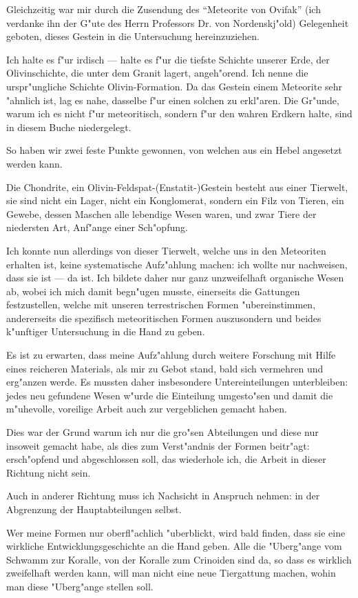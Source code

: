\documentclass[a4paper, 11pt, oneside]{article}
\begin{document}
Gleichzeitig war mir durch die Zusendung des "`Meteorite von Ovifak"' (ich verdanke ihn der G"ute des Herrn Professors Dr. von Nordenskj"old) Gelegenheit geboten, dieses Gestein in die Untersuchung hereinzuziehen.

Ich halte es f"ur irdisch --- halte es f"ur die tiefste Schichte unserer Erde, der Olivinschichte, die unter dem Granit lagert, angeh"orend. Ich nenne die urspr"ungliche Schichte Olivin-Formation. Da das Gestein einem Meteorite sehr "ahnlich ist, lag es nahe, dasselbe f"ur einen solchen zu erkl"aren. Die Gr"unde, warum ich es nicht f"ur meteoritisch, sondern f"ur den wahren Erdkern halte, sind in diesem Buche niedergelegt.

So haben wir zwei feste Punkte gewonnen, von welchen aus ein Hebel angesetzt werden kann.

Die Chondrite, ein Olivin-Feldspat-(Enstatit-)Gestein besteht aus einer Tierwelt, sie sind nicht ein Lager, nicht ein Konglomerat, sondern ein Filz von Tieren, ein Gewebe, dessen Maschen alle lebendige Wesen waren, und zwar Tiere der niedersten Art, Anf"ange einer Sch"opfung.

Ich konnte nun allerdings von dieser Tierwelt, welche uns in den Meteoriten erhalten ist, keine systematische Aufz"ahlung machen: ich wollte nur nachweisen, dass sie ist --- da ist. Ich bildete daher nur ganz unzweifelhaft organische Wesen ab, wobei ich mich damit begn"ugen musste, einerseits die Gattungen festzustellen, welche mit unseren terrestrischen Formen "ubereinstimmen, andererseits die spezifisch meteoritischen Formen auszusondern und beides k"unftiger Untersuchung in die Hand zu geben.

Es ist zu erwarten, dass meine Aufz"ahlung durch weitere Forschung mit Hilfe eines reicheren Materials, als mir zu Gebot stand, bald sich vermehren und erg"anzen werde. Es mussten daher insbesondere Untereinteilungen unterbleiben: jedes neu gefundene Wesen w"urde die Einteilung umgesto"sen und damit die m"uhevolle, voreilige Arbeit auch zur vergeblichen gemacht haben.

Dies war der Grund warum ich nur die gro"sen Abteilungen und diese nur insoweit gemacht habe, als dies zum Verst"andnis der Formen beitr"agt: ersch"opfend und abgeschlossen soll, das wiederhole ich, die Arbeit in dieser Richtung nicht sein.

Auch in anderer Richtung muss ich Nachsicht in Anspruch nehmen: in der Abgrenzung der Hauptabteilungen selbst.

Wer meine Formen nur oberfl"achlich "uberblickt, wird bald finden, dass sie eine wirkliche Entwicklungsgeschichte an die Hand geben. Alle die "Uberg"ange vom Schwamm zur Koralle, von der Koralle zum Crinoiden sind da, so dass es wirklich zweifelhaft werden kann, will man nicht eine neue Tiergattung machen, wohin man diese "Uberg"ange stellen soll.
\end{document}
